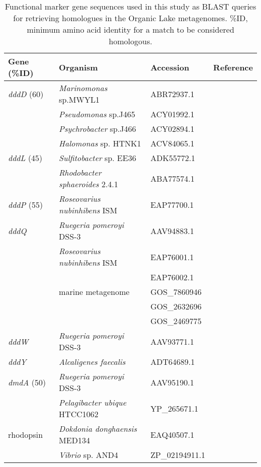 \begin{table}
\footnotesize
\caption[List of query functional marker gene sequences]{Functional marker gene sequences used in this study as \ac{BLAST} queries for retrieving homologues in the Organic Lake metagenomes. \%ID, minimum amino acid identity for a match to be considered homologous.}
\label{tab:marker_genes}
\smallskip
\begin{tabularx}{\textwidth}{p{1.6cm}Xp{1.8cm}p{3.5cm}}
\toprule
\textbf{Gene (\%ID)} & \textbf{Organism} & \textbf{Accession} & \textbf{Reference} \\
\midrule
\emph{dddD} (60) & \emph{Marinomonas} sp.MWYL1 & ABR72937.1 &  \citet{Todd2007}\\
 & \emph{Pseudomonas} sp.J465 & ACY01992.1 & \citet{Curson2010}\\
 & \emph{Psychrobacter} sp.J466 & ACY02894.1 & \citet{Curson2010}\\
 & \emph{Halomonas} sp. HTNK1 & ACV84065.1 & \citet{Todd2010}\\
\emph{dddL} (45) & \emph{Sulfitobacter} sp. EE36 & ADK55772.1 & \citet{Curson2008}\\
 & \emph{Rhodobacter sphaeroides} 2.4.1 & ABA77574.1 & \citet{Curson2008}\\
\emph{dddP} (55) & \emph{Roseovarius nubinhibens} ISM & EAP77700.1 & \citet{Todd2009}\\
\emph{dddQ} & \emph{Ruegeria pomeroyi} DSS-3 & AAV94883.1 & \citet{}\\
 & \emph{Roseovarius nubinhibens} ISM & EAP76001.1 & \citet{}\\
 &  & EAP76002.1 & \citet{Todd2011}\\
 & marine metagenome & GOS\_7860946 & \citet{Todd2011}\\
 &  & GOS\_2632696 & \citet{Todd2011}\\
 &  & GOS\_2469775 & \citet{Todd2011}\\
\emph{dddW} & \emph{Ruegeria pomeroyi} DSS-3 & AAV93771.1 & \citet{Todd2012}\\
\emph{dddY} & \emph{Alcaligenes faecalis} & ADT64689.1 & \citet{Curson2011a}\\
\emph{dmdA} (50) & \emph{Ruegeria pomeroyi} DSS-3 & AAV95190.1 & \citet{Howard2006}\\
 & \emph{Pelagibacter ubique} HTCC1062 & YP\_265671.1 & \citet{Howard2006}\\
rhodopsin & \emph{Dokdonia donghaensis} MED134 & EAQ40507.1 & \citet{Gomez-Consarnau2007}\\
 & \emph{Vibrio} sp. AND4 & ZP\_02194911.1 & \citet{Gomez-Consarnau2010}\\

\end{tabularx}
\end{table}
